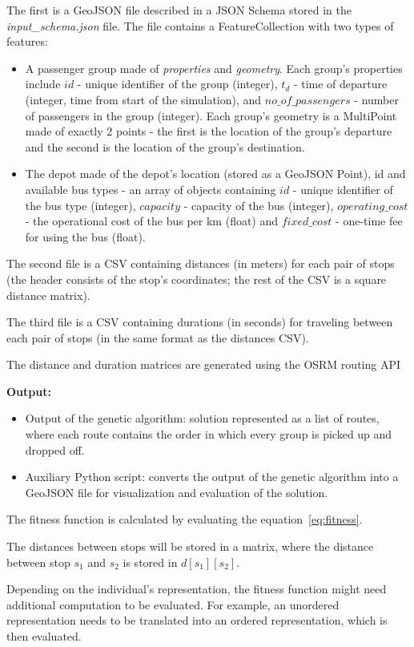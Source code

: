 The first is a GeoJSON file described in a JSON Schema stored in the \textit{input\_schema.json} file. The file contains a FeatureCollection with two types of features:
\begin{itemize}
    \item A passenger group made of \textit{properties} and \textit{geometry}. Each group's properties include $id$ - unique identifier of the group (integer), $t_d$ - time of departure (integer, time from start of the simulation), and $no\_of\_passengers$ - number of passengers in the group (integer). Each group's geometry is a MultiPoint made of exactly 2 points - the first is the location of the group's departure and the second is the location of the group's destination.
    \item The depot made of the depot's location (stored as a GeoJSON Point), id and available bus types - an array of objects containing $id$ - unique identifier of the bus type (integer), $capacity$ - capacity of the bus (integer), $operating\_cost$ - the operational cost of the bus per km (float) and $fixed\_cost$ - one-time fee for using the bus (float).
\end{itemize}

The second file is a CSV containing distances (in meters) for each pair of stops (the header consists of the stop's coordinates; the rest of the CSV is a square distance matrix).

The third file is a CSV containing durations (in seconds) for traveling between each pair of stops (in the same format as the distances CSV).

The distance and duration matrices are generated using the OSRM routing API \cite{luxen-vetter-2011}

\textbf{Output:}

\begin{itemize}
    \item Output of the genetic algorithm: solution represented as a list of routes, where each route contains the order in which every group is picked up and dropped off.
    \item Auxiliary Python script: converts the output of the genetic algorithm into a GeoJSON file for visualization and evaluation of the solution.
\end{itemize}


The fitness function is calculated by evaluating the equation~\eqref{eq:fitness}.

The distances between stops will be stored in a matrix, where the distance between stop $s_1$ and $s_2$ is stored in $d[s_1][s_2]$.

Depending on the individual's representation, the fitness function might need additional computation to be evaluated. For example, an unordered representation needs to be translated into an ordered representation, which is then evaluated.
